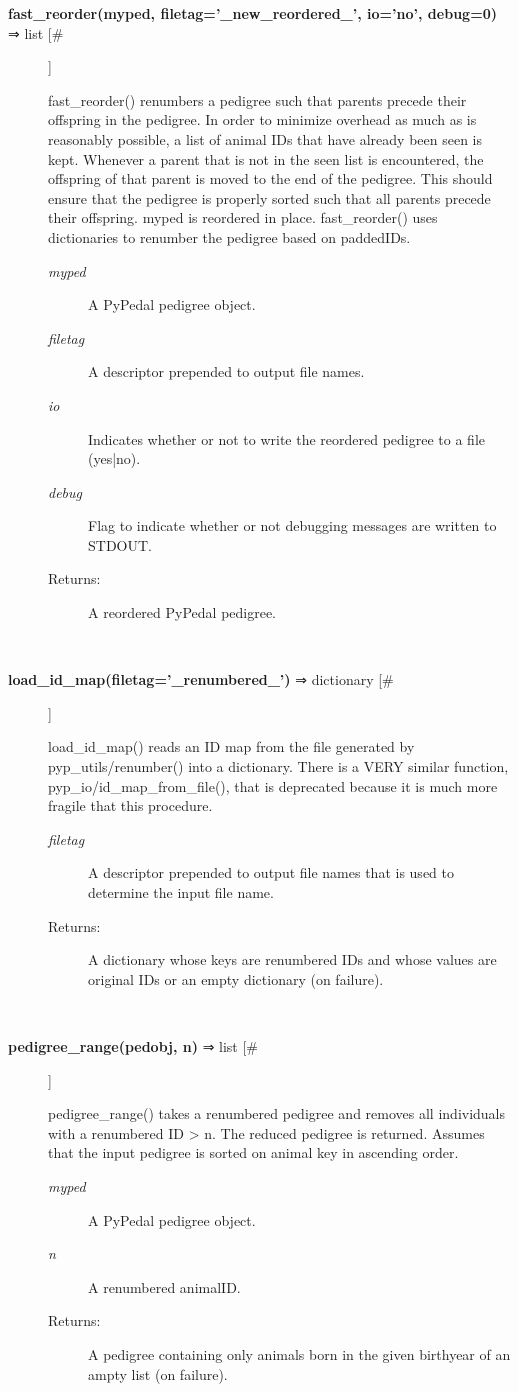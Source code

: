 \begin{description}
\item[\textbf{fast\_reorder(myped, filetag='\_new\_reordered\_', io='no', debug=0)} ⇒ list [\#]
]
\par fast\_reorder() renumbers a pedigree such that parents precede their offspring in
the pedigree.  In order to minimize overhead as much as is reasonably possible,
a list of animal IDs that have already been seen is kept.  Whenever a parent
that is not in the seen list is encountered, the offspring of that parent is
moved to the end of the pedigree.  This should ensure that the pedigree is
properly sorted such that all parents precede their offspring.  myped is
reordered in place.  fast\_reorder() uses dictionaries to renumber the pedigree
based on paddedIDs.
\begin{description}
\item[\textit{myped}
]
A PyPedal pedigree object.
\item[\textit{filetag}
]
A descriptor prepended to output file names.
\item[\textit{io}
]
Indicates whether or not to write the reordered pedigree to a file (yes|no).
\item[\textit{debug}
]
Flag to indicate whether or not debugging messages are written to STDOUT.
\item[Returns:
]
A reordered PyPedal pedigree.
\end{description}\\

\item[\textbf{load\_id\_map(filetag='\_renumbered\_')} ⇒ dictionary [\#]
]
\par load\_id\_map() reads an ID map from the file generated by pyp\_utils/renumber()
into a dictionary.  There is a VERY similar function, pyp\_io/id\_map\_from\_file(), that
is deprecated because it is much more fragile that this procedure.
\begin{description}
\item[\textit{filetag}
]
A descriptor prepended to output file names that is used to determine the input file name.
\item[Returns:
]
A dictionary whose keys are renumbered IDs and whose values are original IDs or an empty dictionary (on failure).
\end{description}\\

\item[\textbf{pedigree\_range(pedobj, n)} ⇒ list [\#]
]
\par pedigree\_range() takes a renumbered pedigree and removes all individuals
with a renumbered ID > n.  The reduced pedigree is returned.  Assumes that
the input pedigree is sorted on animal key in ascending order.
\begin{description}
\item[\textit{myped}
]
A PyPedal pedigree object.
\item[\textit{n}
]
A renumbered animalID.
\item[Returns:
]
A pedigree containing only animals born in the given birthyear of an ampty list (on failure).
\end{description}\\


\end{description}
